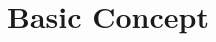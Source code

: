 \documentclass[12pt, aspectratio=1610]{beamer}
\title{\tv{Gauge RR}}
\author{Yong-Gyu. SON}
\begin{document}
  \maketitle

\section{Basic Concept}
    
\end{document}

